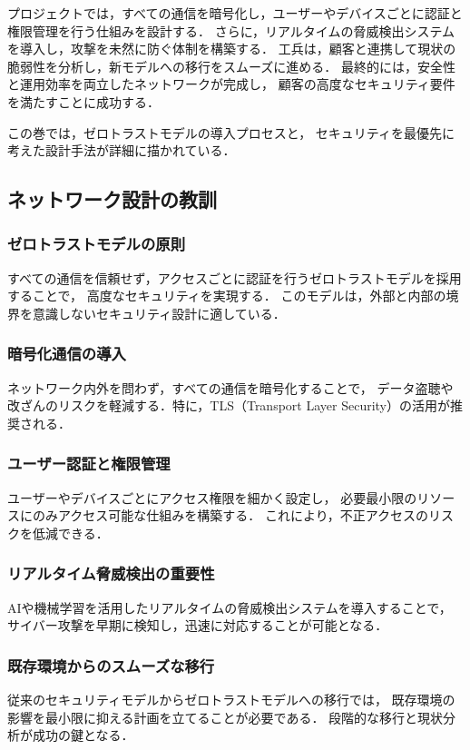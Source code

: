 \documentclass[titlepage,a4paper]{jsarticle}
\begin{document}
プロジェクトでは，すべての通信を暗号化し，ユーザーやデバイスごとに認証と権限管理を行う仕組みを設計する．
さらに，リアルタイムの脅威検出システムを導入し，攻撃を未然に防ぐ体制を構築する．
工兵は，顧客と連携して現状の脆弱性を分析し，新モデルへの移行をスムーズに進める．
最終的には，安全性と運用効率を両立したネットワークが完成し，
顧客の高度なセキュリティ要件を満たすことに成功する．

この巻では，ゼロトラストモデルの導入プロセスと，
セキュリティを最優先に考えた設計手法が詳細に描かれている．

\subsection{ネットワーク設計の教訓}
\subsubsection{ゼロトラストモデルの原則}
すべての通信を信頼せず，アクセスごとに認証を行うゼロトラストモデルを採用することで，
高度なセキュリティを実現する．
このモデルは，外部と内部の境界を意識しないセキュリティ設計に適している．

\subsubsection{暗号化通信の導入}
ネットワーク内外を問わず，すべての通信を暗号化することで，
データ盗聴や改ざんのリスクを軽減する．特に，TLS（Transport Layer Security）の活用が推奨される．

\subsubsection{ユーザー認証と権限管理}
ユーザーやデバイスごとにアクセス権限を細かく設定し，
必要最小限のリソースにのみアクセス可能な仕組みを構築する．
これにより，不正アクセスのリスクを低減できる．

\subsubsection{リアルタイム脅威検出の重要性}
AIや機械学習を活用したリアルタイムの脅威検出システムを導入することで，
サイバー攻撃を早期に検知し，迅速に対応することが可能となる．

\subsubsection{既存環境からのスムーズな移行}
従来のセキュリティモデルからゼロトラストモデルへの移行では，
既存環境の影響を最小限に抑える計画を立てることが必要である．
段階的な移行と現状分析が成功の鍵となる．
\end{document}
